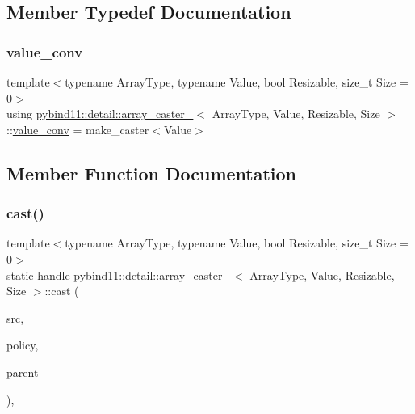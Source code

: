 \subsection{Member Typedef Documentation}
\mbox{\label{structpybind11_1_1detail_1_1array__caster___a39e6e57cd2c8ab3c8cc81ee85fcfbcc6}} 
\subsubsection{\texorpdfstring{value\+\_\+conv}{value\_conv}}
{\footnotesize\ttfamily template$<$typename Array\+Type, typename Value, bool Resizable, size\+\_\+t Size = 0$>$ \\
using \hyperlink{structpybind11_1_1detail_1_1array__caster__}{pybind11\+::detail\+::array\+\_\+caster\+\_\+}$<$ Array\+Type, Value, Resizable, Size $>$\+::\hyperlink{structpybind11_1_1detail_1_1array__caster___a39e6e57cd2c8ab3c8cc81ee85fcfbcc6}{value\+\_\+conv} =  make\+\_\+caster$<$Value$>$}



\subsection{Member Function Documentation}
\mbox{\label{structpybind11_1_1detail_1_1array__caster___a5b2accfaf6b0ca00cb250a511d7e037a}} 
\subsubsection{\texorpdfstring{cast()}{cast()}}
{\footnotesize\ttfamily template$<$typename Array\+Type, typename Value, bool Resizable, size\+\_\+t Size = 0$>$ \\
static handle \hyperlink{structpybind11_1_1detail_1_1array__caster__}{pybind11\+::detail\+::array\+\_\+caster\+\_\+}$<$ Array\+Type, Value, Resizable, Size $>$\+::cast (\begin{DoxyParamCaption}\item[{const Array\+Type \&}]{src,  }\item[{return\+\_\+value\+\_\+policy}]{policy,  }\item[{handle}]{parent }\end{DoxyParamCaption})\hspace{0.3cm}{\ttfamily [inline]}, {\ttfamily [static]}}

